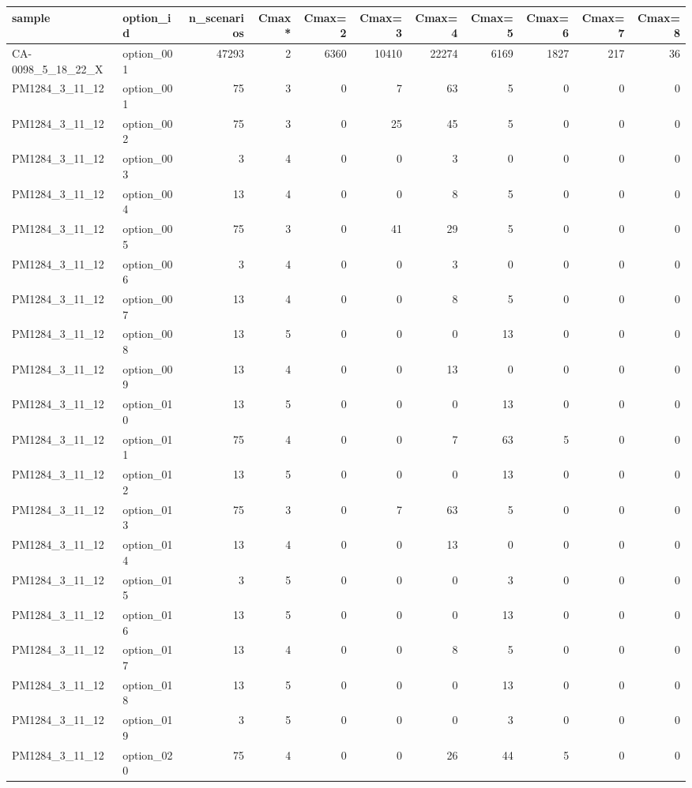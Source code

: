 \begin{tabular}{llrrrrrrrrr}
\toprule
sample & option\_id & n\_scenarios & Cmax* & Cmax=2 & Cmax=3 & Cmax=4 & Cmax=5 & Cmax=6 & Cmax=7 & Cmax=8 \\
\midrule
CA-0098\_5\_18\_22\_X & option\_001 & 47293 & 2 & 6360 & 10410 & 22274 & 6169 & 1827 & 217 & 36 \\
PM1284\_3\_11\_12 & option\_001 & 75 & 3 & 0 & 7 & 63 & 5 & 0 & 0 & 0 \\
PM1284\_3\_11\_12 & option\_002 & 75 & 3 & 0 & 25 & 45 & 5 & 0 & 0 & 0 \\
PM1284\_3\_11\_12 & option\_003 & 3 & 4 & 0 & 0 & 3 & 0 & 0 & 0 & 0 \\
PM1284\_3\_11\_12 & option\_004 & 13 & 4 & 0 & 0 & 8 & 5 & 0 & 0 & 0 \\
PM1284\_3\_11\_12 & option\_005 & 75 & 3 & 0 & 41 & 29 & 5 & 0 & 0 & 0 \\
PM1284\_3\_11\_12 & option\_006 & 3 & 4 & 0 & 0 & 3 & 0 & 0 & 0 & 0 \\
PM1284\_3\_11\_12 & option\_007 & 13 & 4 & 0 & 0 & 8 & 5 & 0 & 0 & 0 \\
PM1284\_3\_11\_12 & option\_008 & 13 & 5 & 0 & 0 & 0 & 13 & 0 & 0 & 0 \\
PM1284\_3\_11\_12 & option\_009 & 13 & 4 & 0 & 0 & 13 & 0 & 0 & 0 & 0 \\
PM1284\_3\_11\_12 & option\_010 & 13 & 5 & 0 & 0 & 0 & 13 & 0 & 0 & 0 \\
PM1284\_3\_11\_12 & option\_011 & 75 & 4 & 0 & 0 & 7 & 63 & 5 & 0 & 0 \\
PM1284\_3\_11\_12 & option\_012 & 13 & 5 & 0 & 0 & 0 & 13 & 0 & 0 & 0 \\
PM1284\_3\_11\_12 & option\_013 & 75 & 3 & 0 & 7 & 63 & 5 & 0 & 0 & 0 \\
PM1284\_3\_11\_12 & option\_014 & 13 & 4 & 0 & 0 & 13 & 0 & 0 & 0 & 0 \\
PM1284\_3\_11\_12 & option\_015 & 3 & 5 & 0 & 0 & 0 & 3 & 0 & 0 & 0 \\
PM1284\_3\_11\_12 & option\_016 & 13 & 5 & 0 & 0 & 0 & 13 & 0 & 0 & 0 \\
PM1284\_3\_11\_12 & option\_017 & 13 & 4 & 0 & 0 & 8 & 5 & 0 & 0 & 0 \\
PM1284\_3\_11\_12 & option\_018 & 13 & 5 & 0 & 0 & 0 & 13 & 0 & 0 & 0 \\
PM1284\_3\_11\_12 & option\_019 & 3 & 5 & 0 & 0 & 0 & 3 & 0 & 0 & 0 \\
PM1284\_3\_11\_12 & option\_020 & 75 & 4 & 0 & 0 & 26 & 44 & 5 & 0 & 0 \\

\end{tabular}
